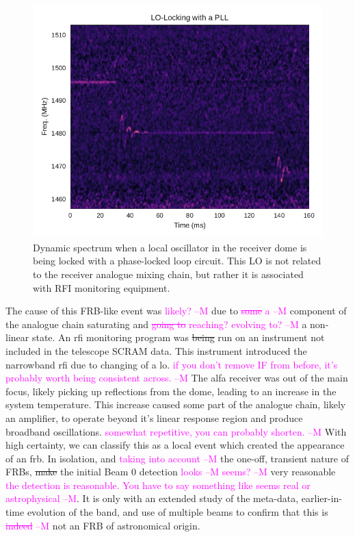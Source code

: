 \documentclass[a4paper,fleqn,usenatbib]{mnras}
\newcommand{\cM}[1]{\textcolor{magenta}{ #1 --M}}
\begin{document}
\begin{figure}
    \includegraphics[width=1.0\linewidth]{figures/pll_spectrum.pdf}
    \caption{Dynamic spectrum when a local oscillator in the receiver dome is
    being locked with a phase-locked loop circuit. This LO is not related to
    the receiver analogue mixing chain, but rather it is associated with RFI
    monitoring equipment.
    }
    \label{fig:pll_spectrum}
\end{figure}

The cause of this FRB-like event was \cM{likely?} due to \cM{\sout{some} a} component of the analogue chain
saturating and \cM{\sout{going to} reaching? evolving to?} a non-linear state.  An \gls{rfi} monitoring program was
\sout{being} run on an instrument not included in the telescope SCRAM data. This
instrument introduced the narrowband \gls{rfi} due to changing of a \gls{lo}. \cM{if you don't remove IF from before, it's probably worth being consistent across.}
The \gls{alfa} receiver was out of the main focus, likely picking up reflections
from the dome, leading to an increase in the system temperature.  This increase
caused some part of the analogue chain, likely an amplifier, to operate beyond
it's linear response region and produce broadband oscillations. \cM{somewhat repetitive, you can probably shorten.} With high
certainty, we can classify this as a local event which created the appearance of
an \gls{frb}.  In isolation, and \cM{taking into account} the one-off, transient nature of FRBs, \sout{make} the
initial Beam 0 detection \cM{looks} \cM{seems?} very reasonable \cM{the detection is reasonable. You have to say something like seems real or astrophysical}. It is only with an extended study
of the meta-data, earlier-in-time evolution of the band, and use of multiple
beams to confirm that this is \cM{\sout{indeed}} not an FRB of astronomical origin.
\end{document}
